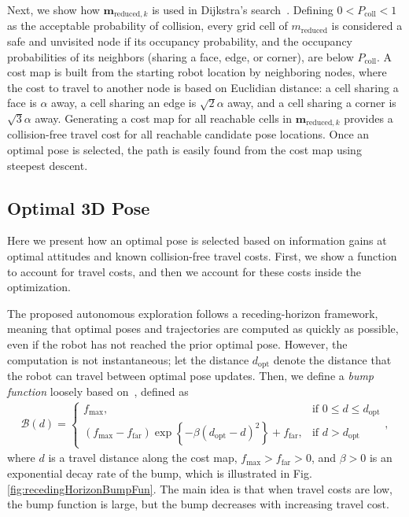\documentclass[conf]{new-aiaa}
\newcommand{\braces}[1]{\ensuremath{\left\{ #1 \right\}}}
\begin{document}
Next, we show how $\mathbf{m}_{\text{reduced},k}$ is used in Dijkstra's search~\cite{Dij59}. Defining $0<P_\text{coll}<1$ as the acceptable probability of collision, every grid cell of $m_\text{reduced}$ is considered a safe and unvisited node if its occupancy probability, and the occupancy probabilities of its neighbors (sharing a face, edge, or corner), are below $P_\text{coll}$. A cost map is built from the starting robot location by neighboring nodes, where the cost to travel to another node is based on Euclidian distance: a cell sharing a face is $\alpha$ away, a cell sharing an edge is $\sqrt2\alpha$ away, and a cell sharing a corner is $\sqrt3\alpha$ away. Generating a cost map for all reachable cells in $\mathbf{m}_{\text{reduced},k}$ provides a collision-free travel cost for all reachable candidate pose locations. Once an optimal pose is selected, the path is easily found from the cost map using steepest descent.


\subsection{Optimal 3D Pose}

Here we present how an optimal pose is selected based on information gains at optimal attitudes and known collision-free travel costs. First, we show a function to account for travel costs, and then we account for these costs inside the optimization.

The proposed autonomous exploration follows a receding-horizon framework, meaning that optimal poses and trajectories are computed as quickly as possible, even if the robot has not reached the prior optimal pose. However, the computation is not instantaneous; let the distance $d_\text{opt}$ denote the distance that the robot can travel between optimal pose updates. Then, we define a \emph{bump function} loosely based on~\cite{Joh06}, defined as
\begin{align}
\label{eqn:BumpFunRecedingHorizon}
\mathcal B(d)=
\begin{cases}
f_\text{max},												& \text{if }0\leq d\leq d_\text{opt}
\\
(f_\text{max}-f_\text{far})\exp\braces{-\beta(d_\text{opt}-d)^2}+f_\text{far},	& \text{if }d>d_\text{opt}
\end{cases},
\end{align}
where $d$ is a travel distance along the cost map, $f_\text{max}>f_\text{far}>0$, and $\beta>0$ is an exponential decay rate of the bump, which is illustrated in Fig. \ref{fig:recedingHorizonBumpFun}. The main idea is that when travel costs are low, the bump function is large, but the bump decreases with increasing travel cost.
\end{document}

